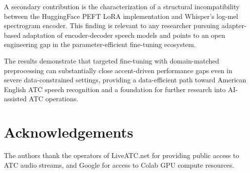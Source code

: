 \documentclass[11pt,a4paper]{article}
\begin{document}
A secondary contribution is the characterization of a structural
incompatibility between the HuggingFace PEFT LoRA implementation and
Whisper's log-mel spectrogram encoder. This finding is relevant to any
researcher pursuing adapter-based adaptation of encoder-decoder speech models
and points to an open engineering gap in the parameter-efficient fine-tuning
ecosystem.

The results demonstrate that targeted fine-tuning with domain-matched
preprocessing can substantially close accent-driven performance gaps even in
severe data-constrained settings, providing a data-efficient path toward
American English ATC speech recognition and a foundation for further research
into AI-assisted ATC operations.

\section*{Acknowledgements}

The authors thank the operators of LiveATC.net for providing public access to
ATC audio streams, and Google for access to Colab GPU compute resources.



\end{document}
